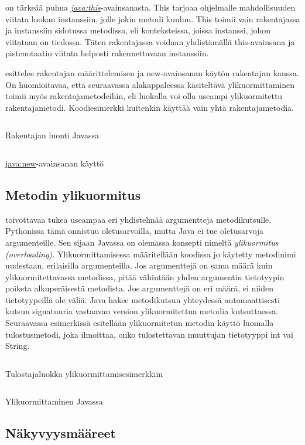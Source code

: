 \documentclass{tufte-book}
\newcommand{\eng}[1]{\textit{(#1)}}
\newcommand{\new}[1]{\textit{\gls{#1}}}
\newcommand{\neweng}[2]{\new{#1} \eng{#2}}
\newcommand{\java}[1]{\underline{\gls{java:#1}}}
\newcommand{\newjava}[1]{\textit{\java{#1}}}
\newcommand{\code}[3]{
\begin{listing}
    \inputminted{java}{OhjelmointiopasEsimerkit/src/#1/#2.java}
    \caption{#3}
    \label{Java-#1-#2}
\end{listing}
}
\begin{document}
 on tärkeää puhua \newjava{this}-avainsanasta. This tarjoaa
ohjelmalle mahdollisuuden viitata luokan instanssiin, jolle jokin metodi kuuluu. This toimii
vain rakentajassa ja instanssiin sidotussa metodissa, eli konteksteissa, joissa instanssi, johon
viitataan on tiedossa. Täten rakentajassa voidaan yhdistämällä this-avainsana ja pistenotaatio
viitata helposti rakennettavaan instanssiin.

 esittelee rakentajan määrittelemisen ja new-avainsanan
käytön rakentajan kanssa. On huomioitavaa, että seuraavassa alakappaleessa käsiteltävä
ylikuormittaminen toimii myös rakentajametodeihin, eli luokalla voi olla useampi ylikuormitettu
rakentajametodi. Koodiesimerkki kuitenkin käyttää vain yhtä rakentajametodia.

\code{week2/constructorexample}{ClassWithConstructor}{Rakentajan luonti Javassa}
\code{week2/constructorexample}{ConstructorExample}{\java{new}-avainsanan käyttö}


\subsection{Metodin ylikuormitus}
\label{overloading}

 toivottavaa tukea useampaa eri yhdistelmää argumentteja metodikutsulle.
Pythonissa tämä onnistuu oletusarvoilla, mutta Java ei tue oletusarvoja argumenteille. Sen
sijaan Javassa on olemassa konsepti nimeltä \neweng{ylikuormitus}{overloading}.
Ylikuormittamisessa määritellään koodissa jo käytetty metodinimi uudestaan, erilaisilla
argumenteilla. Jos argumenttejä on sama määrä kuin ylikuormitettavassa metodissa, pitää vähintään
yhden argumentin tietotyypin poiketa alkuperäisestä metodista. Jos argumenttejä on eri määrä, ei
niiden tietotyypeillä ole väliä. Java hakee metodikutsun yhteydessä automaattisesti kutsun
signatuuria vastaavan version ylikuormitettua metodia kutsuttaessa. Seuraavassa esimerkissä
esitellään ylikuormitetun metodin käyttö luomalla tulostusmetodi, joka ilmoittaa, onko
tulostettavan muuttujan tietotyyppi int vai String.

\code{week2/overloadingexample}{OverloadedPrinter}{Tulostajaluokka ylikuormittamisesimerkkiin}
\code{week2/overloadingexample}{OverloadingExample}{Ylikuormittaminen Javassa}

\subsection{Näkyvyysmääreet}
\label{näkyvyysmääreet}
\end{document}
